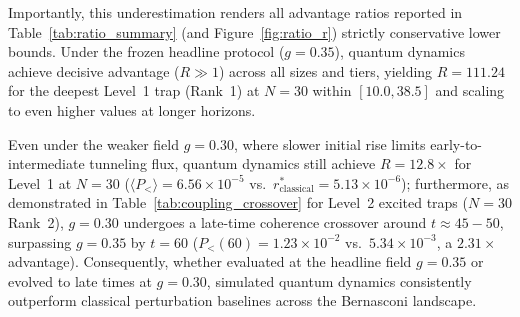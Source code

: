 \documentclass[10pt,twocolumn,a4paper]{article}
\begin{document}
Importantly, this underestimation renders all advantage ratios reported in Table~\ref{tab:ratio_summary} (and Figure~\ref{fig:ratio_r}) strictly conservative lower bounds. Under the frozen headline protocol ($g = 0.35$), quantum dynamics achieve decisive advantage ($R \gg 1$) across all sizes and tiers, yielding $R = 111.24$ for the deepest Level~1 trap (Rank~1) at $N = 30$ within $[10.0, 38.5]$ and scaling to even higher values at longer horizons. 

Even under the weaker field $g = 0.30$, where slower initial rise limits early-to-intermediate tunneling flux, quantum dynamics still achieve $R = 12.8\times$ for Level~1 at $N = 30$ ($\langle P_< \rangle = 6.56 \times 10^{-5}$ vs.\ $r_{\mathrm{classical}}^* = 5.13 \times 10^{-6}$); furthermore, as demonstrated in Table~\ref{tab:coupling_crossover} for Level~2 excited traps ($N = 30$ Rank~2), $g = 0.30$ undergoes a late-time coherence crossover around $t \approx 45 - 50$, surpassing $g = 0.35$ by $t = 60$ ($P_<(60) = 1.23 \times 10^{-2}$ vs.\ $5.34 \times 10^{-3}$, a $2.31\times$ advantage). Consequently, whether evaluated at the headline field $g = 0.35$ or evolved to late times at $g = 0.30$, simulated quantum dynamics consistently outperform classical perturbation baselines across the Bernasconi landscape.

\end{document}
